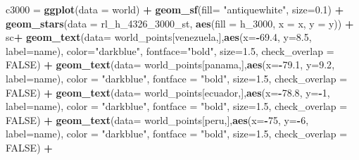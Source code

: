 \documentclass[12pt,twoside]{reedthesis}
\newenvironment{Shaded}{\begin{snugshade}}{\end{snugshade}}
\newcommand{\DataTypeTok}[1]{\textcolor[rgb]{0.13,0.29,0.53}{#1}}
\newcommand{\DecValTok}[1]{\textcolor[rgb]{0.00,0.00,0.81}{#1}}
\newcommand{\FloatTok}[1]{\textcolor[rgb]{0.00,0.00,0.81}{#1}}
\newcommand{\KeywordTok}[1]{\textcolor[rgb]{0.13,0.29,0.53}{\textbf{#1}}}
\newcommand{\NormalTok}[1]{#1}
\newcommand{\OperatorTok}[1]{\textcolor[rgb]{0.81,0.36,0.00}{\textbf{#1}}}
\newcommand{\OtherTok}[1]{\textcolor[rgb]{0.56,0.35,0.01}{#1}}
\newcommand{\StringTok}[1]{\textcolor[rgb]{0.31,0.60,0.02}{#1}}
\begin{document}
\begin{Shaded}
\begin{Highlighting}[]
\NormalTok{c3000 =}\StringTok{ }\KeywordTok{ggplot}\NormalTok{(}\DataTypeTok{data =}\NormalTok{ world) }\OperatorTok{+}\StringTok{ }
\StringTok{  }\KeywordTok{geom_sf}\NormalTok{(}\DataTypeTok{fill=} \StringTok{"antiquewhite"}\NormalTok{, }\DataTypeTok{size=}\FloatTok{0.1}\NormalTok{) }\OperatorTok{+}\StringTok{ }
\StringTok{  }\KeywordTok{geom_stars}\NormalTok{(}\DataTypeTok{data =}\NormalTok{ rl_h_}\DecValTok{4326}\NormalTok{_}\DecValTok{3000}\NormalTok{_st, }\KeywordTok{aes}\NormalTok{(}\DataTypeTok{fill =}\NormalTok{ h_}\DecValTok{3000}\NormalTok{, }\DataTypeTok{x =}\NormalTok{ x, }\DataTypeTok{y =}\NormalTok{ y)) }\OperatorTok{+}\StringTok{ }
\StringTok{  }\NormalTok{sc}\OperatorTok{+}
\StringTok{  }\KeywordTok{geom_text}\NormalTok{(}\DataTypeTok{data=}\NormalTok{ world_points[venezuela,],}\KeywordTok{aes}\NormalTok{(}\DataTypeTok{x=}\OperatorTok{-}\FloatTok{69.4}\NormalTok{, }\DataTypeTok{y=}\FloatTok{8.5}\NormalTok{, }\DataTypeTok{label=}\NormalTok{name), }\DataTypeTok{color=}\StringTok{"darkblue"}\NormalTok{, }\DataTypeTok{fontface=}\StringTok{"bold"}\NormalTok{, }\DataTypeTok{size=}\FloatTok{1.5}\NormalTok{, }\DataTypeTok{check_overlap =} \OtherTok{FALSE}\NormalTok{) }\OperatorTok{+}
\StringTok{  }\KeywordTok{geom_text}\NormalTok{(}\DataTypeTok{data=}\NormalTok{ world_points[panama,],}\KeywordTok{aes}\NormalTok{(}\DataTypeTok{x=}\OperatorTok{-}\FloatTok{79.1}\NormalTok{, }\DataTypeTok{y=}\FloatTok{9.2}\NormalTok{, }\DataTypeTok{label=}\NormalTok{name), }\DataTypeTok{color =} \StringTok{"darkblue"}\NormalTok{, }\DataTypeTok{fontface =} \StringTok{"bold"}\NormalTok{, }\DataTypeTok{size=}\FloatTok{1.5}\NormalTok{, }\DataTypeTok{check_overlap =} \OtherTok{FALSE}\NormalTok{) }\OperatorTok{+}\StringTok{ }
\StringTok{  }\KeywordTok{geom_text}\NormalTok{(}\DataTypeTok{data=}\NormalTok{ world_points[ecuador,],}\KeywordTok{aes}\NormalTok{(}\DataTypeTok{x=}\OperatorTok{-}\FloatTok{78.8}\NormalTok{, }\DataTypeTok{y=}\OperatorTok{-}\DecValTok{1}\NormalTok{, }\DataTypeTok{label=}\NormalTok{name), }\DataTypeTok{color =} \StringTok{"darkblue"}\NormalTok{, }\DataTypeTok{fontface =} \StringTok{"bold"}\NormalTok{, }\DataTypeTok{size=}\FloatTok{1.5}\NormalTok{, }\DataTypeTok{check_overlap =} \OtherTok{FALSE}\NormalTok{) }\OperatorTok{+}
\StringTok{  }\KeywordTok{geom_text}\NormalTok{(}\DataTypeTok{data=}\NormalTok{ world_points[peru,],}\KeywordTok{aes}\NormalTok{(}\DataTypeTok{x=}\OperatorTok{-}\DecValTok{75}\NormalTok{, }\DataTypeTok{y=}\OperatorTok{-}\DecValTok{6}\NormalTok{, }\DataTypeTok{label=}\NormalTok{name), }\DataTypeTok{color =} \StringTok{"darkblue"}\NormalTok{, }\DataTypeTok{fontface =} \StringTok{"bold"}\NormalTok{, }\DataTypeTok{size=}\FloatTok{1.5}\NormalTok{, }\DataTypeTok{check_overlap =} \OtherTok{FALSE}\NormalTok{) }\OperatorTok{+}

\end{Highlighting}
\end{Shaded}
\end{document}
